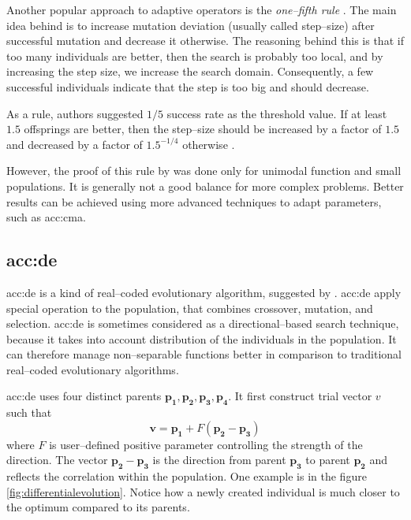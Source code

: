 Another popular approach to adaptive operators is the \emph{one--fifth rule} \citep{onefifthrule}. The main idea behind is to increase mutation deviation (usually called step--size) after successful mutation and decrease it otherwise. The reasoning behind this is that if too many individuals are better, then the search is probably too local, and by increasing the step size, we increase the search domain. Consequently, a few successful individuals indicate that the step is too big and should decrease.

As a rule, authors \citet*{onefifthruleoriginal} suggested $1/5$ success rate as the threshold value. If at least $1.5$ offsprings are better, then the step--size should be increased by a factor of $1.5$ and decreased by a factor of $1.5^{-1/4}$ otherwise \citep{onefifthrule}.

However, the proof of this rule by \citeauthor*{onefifthruleoriginal} was done only for unimodal function and small populations. It is generally not a good balance for more complex problems. Better results can be achieved using more advanced techniques to adapt parameters, such as \acrshort{acc:cma}.

\subsection{\texorpdfstring{\acrlong*{acc:de}}{Differential evolution}}

\acrfull{acc:de} is a kind of real--coded evolutionary algorithm, suggested by \citet*{differentialevolutionoriginal}. \acrshort{acc:de} apply special operation to the population, that combines crossover, mutation, and selection. \acrshort{acc:de} is sometimes considered as a directional--based search technique, because it takes into account distribution of the individuals in the population. It can therefore manage non--separable functions better in comparison to traditional real--coded evolutionary algorithms.

\acrshort{acc:de} uses four distinct parents $\mathbf{p_1}, \mathbf{p_2}, \mathbf{p_3}, \mathbf{p_4}$. It first construct trial vector $v$ such that
$$
\mathbf{v} = \mathbf{p_1} + F\left( \mathbf{p_2} - \mathbf{p_3} \right)
$$
where $F$ is user--defined positive parameter controlling the strength of the direction. The vector $\mathbf{p_2} - \mathbf{p_3}$ is the direction from parent $\mathbf{p_3}$ to parent $\mathbf{p_2}$ and reflects the correlation within the population. One example is in the figure \ref{fig:differentialevolution}. Notice how a newly created individual is much closer to the optimum compared to its parents.

